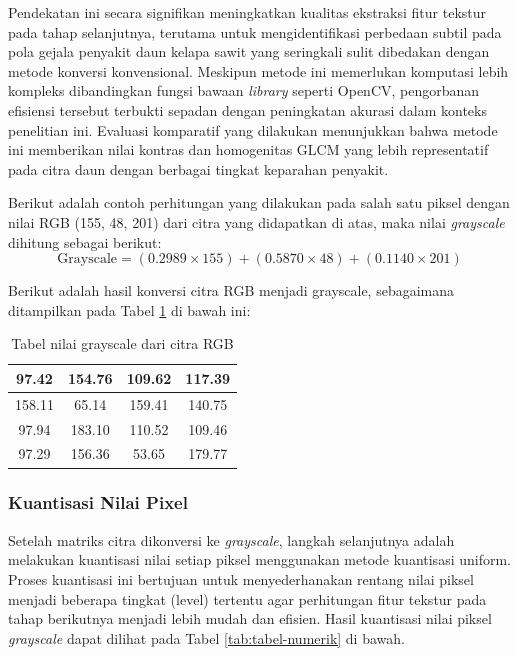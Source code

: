 Pendekatan ini secara signifikan meningkatkan kualitas ekstraksi fitur tekstur pada tahap selanjutnya, terutama untuk mengidentifikasi perbedaan subtil pada pola gejala penyakit daun kelapa sawit yang seringkali sulit dibedakan dengan metode konversi konvensional. Meskipun metode ini memerlukan komputasi lebih kompleks dibandingkan fungsi bawaan \textit{library} seperti OpenCV, pengorbanan efisiensi tersebut terbukti sepadan dengan peningkatan akurasi dalam konteks penelitian ini. Evaluasi komparatif yang dilakukan menunjukkan bahwa metode ini memberikan nilai kontras dan homogenitas GLCM yang lebih representatif pada citra daun dengan berbagai tingkat keparahan penyakit.

Berikut adalah contoh perhitungan yang dilakukan pada salah satu piksel dengan nilai RGB (155, 48, 201) dari citra yang didapatkan di atas, maka nilai \textit{grayscale} dihitung sebagai berikut:
\[
\text{Grayscale} = (0.2989 \times 155) + (0.5870 \times 48) + (0.1140 \times 201)
\]

Berikut adalah hasil konversi citra RGB menjadi grayscale, sebagaimana ditampilkan pada Tabel \ref{tab:tabel-grayscale} di bawah ini:
\begin{table}[H]
\centering
\begin{tabular}{|c|c|c|c|}
\hline
	97.42  & 154.76 & 109.62 & 117.39 \\ \hline
	158.11 & 65.14  & 159.41 & 140.75 \\ \hline
	97.94  & 183.10 & 110.52 & 109.46 \\ \hline
	97.29  & 156.36 & 53.65  & 179.77 \\ \hline
\end{tabular}
\caption{Tabel nilai grayscale dari citra RGB}
\label{tab:tabel-grayscale}
\end{table}

\subsubsection{Kuantisasi Nilai Pixel} \label{III.Kuantisasi Nilai Pixel}
Setelah matriks citra dikonversi ke \textit{grayscale}, langkah selanjutnya adalah melakukan kuantisasi nilai setiap piksel menggunakan metode kuantisasi uniform. Proses kuantisasi ini bertujuan untuk menyederhanakan rentang nilai piksel menjadi beberapa tingkat (level) tertentu agar perhitungan fitur tekstur pada tahap berikutnya menjadi lebih mudah dan efisien. Hasil kuantisasi nilai piksel \textit{grayscale} dapat dilihat pada Tabel \ref{tab:tabel-numerik} di bawah.

